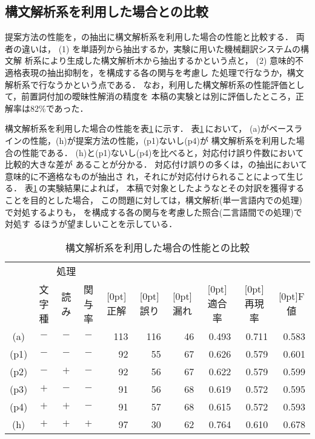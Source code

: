 
\subsection{構文解析系を利用した場合との比較}
\label{sec:experiment:parser}

提案方法の性能を，{\CPNP}の抽出に構文解析系を利用した場合の性能と比較する．
両者の違いは，
(1) {\CPNP}を単語列から抽出するか，実験に用いた機械翻訳システムの構文解
析系により生成した構文解析木から抽出するかという点と，
(2) 意味的不適格表現の抽出抑制を，{\MTNP}を構成する各{\N}の関与を考慮し
た処理で行なうか，構文解析系で行なうかという点である．
なお，利用した構文解析系の性能評価として，前置詞付加の曖昧性解消の精度を
本稿の実験とは別に評価したところ，正解率は82\%であった．

構文解析系を利用した場合の性能を表\ref{tab:parser}\,に示す．
表\ref{tab:parser}\,において，
(a)がベースラインの性能，(h)が提案方法の性能，(p1)ないし(p4)が
構文解析系を利用した場合の性能である．
(h)と(p1)ないし(p4)を比べると，対応付け誤り件数において比較的大きな差が
あることが分かる．
対応付け誤りの多くは，{\CPNP}の抽出において意味的に不適格なものが抽出さ
れ，それに{\JNP}が対応付けられることによって生じる．
表\ref{tab:parser}\,の実験結果によれば，
本稿で対象としたような{\CPNP}とその対訳を獲得することを目的とした場合，
この問題に対しては，構文解析(単一言語内での処理)で対処するよりも，
{\MTNP}を構成する各{\N}の関与を考慮した照合(二言語間での処理)で対処す
るほうが望ましいことを示している．
\begin{table}[htbp]
\caption{構文解析系を利用した場合の性能との比較}
\label{tab:parser}
\begin{center}
\begin{tabular}{|c|c|c|c||r|r|r|r|r|r|}\hline
& \multicolumn{3}{|c||}{処理} & & & & & & \\\cline{2-4}
& 文字種 & 読み & 関与率 & \multicolumn{1}{c|}{\raisebox{1.5ex}[0pt]{正解}} & 
\multicolumn{1}{c|}{\raisebox{1.5ex}[0pt]{誤り}} &  
\multicolumn{1}{c|}{\raisebox{1.5ex}[0pt]{漏れ}} & 
\multicolumn{1}{c|}{\raisebox{1.5ex}[0pt]{適合率}} & 
\multicolumn{1}{c|}{\raisebox{1.5ex}[0pt]{再現率}} & 
\multicolumn{1}{c|}{\raisebox{1.5ex}[0pt]{F値}} \\\hline\hline
(a)  & $-$ & $-$ & $-$ & 113 & 116 & 46 & 0.493 & 0.711 & 0.583 \\
(p1) & $-$ & $-$ & $-$ &  92 &  55 & 67 & 0.626 & 0.579 & 0.601 \\
(p2) & $-$ & $+$ & $-$ &  92 &  56 & 67 & 0.622 & 0.579 & 0.599 \\
(p3) & $+$ & $-$ & $-$ &  91 &  56 & 68 & 0.619 & 0.572 & 0.595 \\
(p4) & $+$ & $+$ & $-$ &  91 &  57 & 68 & 0.615 & 0.572 & 0.593 \\
(h)  & $+$ & $+$ & $+$ &  97 &  30 & 62 & 0.764 & 0.610 & 0.678 \\\hline
\end{tabular}
\end{center}
\end{table}


